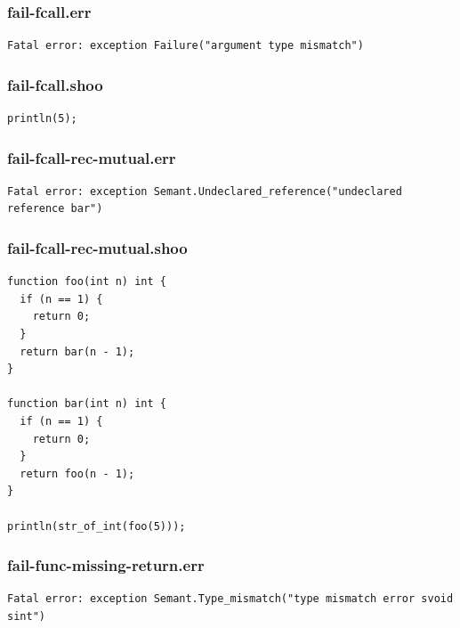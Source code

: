 \documentclass[12pt]{article}
\begin{document}
\subsubsection{fail-fcall.err}
\begin{mdframed}[hidealllines=true,backgroundcolor=green!10]
\begin{lstlisting}
Fatal error: exception Failure("argument type mismatch")
\end{lstlisting}
\end{mdframed}
\subsubsection{fail-fcall.shoo}
\begin{mdframed}[hidealllines=true,backgroundcolor=blue!10]
\begin{lstlisting}
println(5);\end{lstlisting}
\end{mdframed}
\subsubsection{fail-fcall-rec-mutual.err}
\begin{mdframed}[hidealllines=true,backgroundcolor=green!10]
\begin{lstlisting}
Fatal error: exception Semant.Undeclared_reference("undeclared reference bar")
\end{lstlisting}
\end{mdframed}
\subsubsection{fail-fcall-rec-mutual.shoo}
\begin{mdframed}[hidealllines=true,backgroundcolor=blue!10]
\begin{lstlisting}
function foo(int n) int {
  if (n == 1) {
    return 0;
  }
  return bar(n - 1);
}

function bar(int n) int {
  if (n == 1) {
    return 0;
  }
  return foo(n - 1);
}

println(str_of_int(foo(5)));\end{lstlisting}
\end{mdframed}
\subsubsection{fail-func-missing-return.err}
\begin{mdframed}[hidealllines=true,backgroundcolor=green!10]
\begin{lstlisting}
Fatal error: exception Semant.Type_mismatch("type mismatch error svoid sint")
\end{lstlisting}
\end{mdframed}
\end{document}
